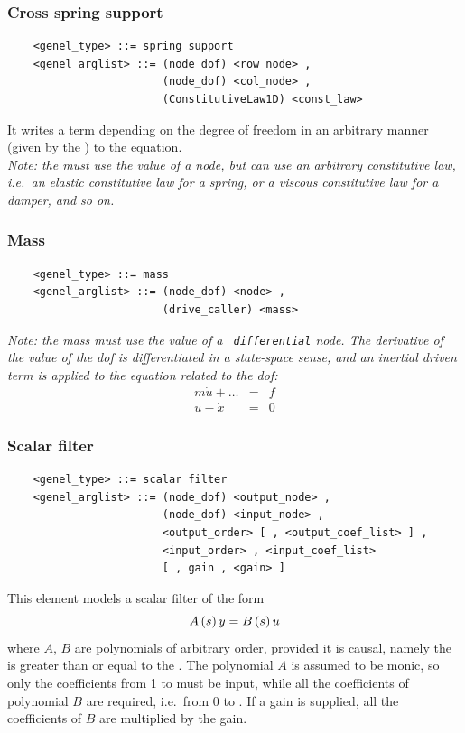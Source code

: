 \subsubsection{Cross spring support}
\begin{verbatim}
    <genel_type> ::= spring support
    <genel_arglist> ::= (node_dof) <row_node> ,                      
                        (node_dof) <col_node> ,                      
                        (ConstitutiveLaw1D) <const_law>
\end{verbatim}
It writes a term depending on the  degree of freedom in an
arbitrary manner (given by the ) to the 
 equation. \\
{\em
    Note: the  must use the  value
    of a  node, but can use an arbitrary constitutive law,
    i.e.\ an elastic constitutive law for a spring, or a viscous
    constitutive law for a damper, and so on.
}

\subsubsection{Mass}
\begin{verbatim}
    <genel_type> ::= mass
    <genel_arglist> ::= (node_dof) <node> ,                     
                        (drive_caller) <mass>
\end{verbatim}
{\em
    Note: the mass must use the  value of a {\tt
    differential} node. The derivative of the  value of
    the dof is differentiated in a state-space sense, and an inertial driven
    term is applied to the equation related to the dof:
    \begin{eqnarray*}
        m\dot{u} + \ldots & = & f \\
	u - \dot{x} & = & 0
    \end{eqnarray*}
}

\subsubsection{Scalar filter}
\begin{verbatim}
    <genel_type> ::= scalar filter
    <genel_arglist> ::= (node_dof) <output_node> ,
                        (node_dof) <input_node> ,
                        <output_order> [ , <output_coef_list> ] ,
                        <input_order> , <input_coef_list>
                        [ , gain , <gain> ]
\end{verbatim}
This element models a scalar filter of the form
\begin{displaymath}
    A\left( s \right)y = B\left( s \right)u
\end{displaymath}
where $ A $, $ B $ are polynomials of arbitrary order, provided it is
causal, namely the  is greater than or equal to 
the .
The polynomial $ A $ is assumed to be monic, so only the coefficients
from 1 to  must be input, while all the coefficients 
of polynomial $ B $ are required, i.e.\ from 0 to .
If a gain is supplied, all the coefficients of $ B $ are multiplied by the
gain.

